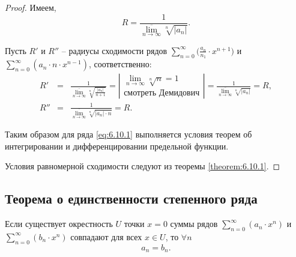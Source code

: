 \begin{proof}
    Имеем,
    \[
        R = \frac{1}{\underset{n\rightarrow\infty}{\overline{\lim}}\sqrt[n]{|a_n|}}.
    \]

    Пусть $R'$ и $R''$ -- радиусы сходимости рядов $\sum_{n=0}^{\infty}\big(\frac{a_n}{n_1} \cdot x^{n+1}\big)$ и \\ $\sum_{n=0}^{\infty}(a_n \cdot n \cdot x^{n-1})$, соответственно:
    \begin{eqnarray*}
        R' & = & \frac{1}{\underset{n\rightarrow\infty}{\overline{\lim}}\sqrt[n]{\frac{|a_n|}{n+1}}} = \left|\begin{array}{l}
            \underset{n\rightarrow\infty}{\lim}\sqrt[n]{n} = 1 \\
            \text{смотреть Демидович}
        \end{array}\right| = \frac{1}{\underset{n\rightarrow\infty}{\overline{\lim}}\sqrt[n]{| a_n | }} = R, \\
        R'' & = & \frac{1}{\underset{n\rightarrow\infty}{\overline{\lim}}\sqrt[n]{|a_n|\cdot n}} = R.
    \end{eqnarray*}

    Таким образом для ряда \ref{eq:6.10.1} выполняется условия теорем об интегрировании и дифференцировании предельной функции.

    Условия равномерной сходимости следуют из теоремы \ref{theorem:6.10.1}.
\end{proof}

\subsection{Теорема о единственности степенного ряда}

\begin{theorem}[Об единственности]
    Если существует окрестность $U$ точки $x = 0$ суммы рядов $\sum_{n=0}^{\infty}(a_n \cdot x^n)$ и $\sum_{n=0}^{\infty}(b_n \cdot x^n)$ совпадают для всех $x \in U$, то $\forall n $
    \[
        a_n = b_n.
    \]
\end{theorem}

